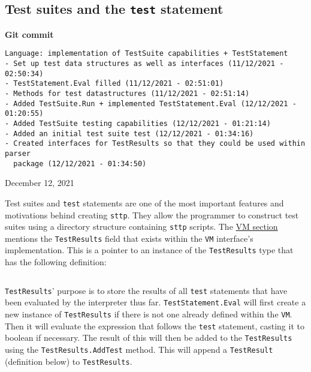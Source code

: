 \cprotect\subsection{Test suites and the \verb|test| statement}

\begin{center}
    \textbf{Git commit}
    \begin{verbatim}
Language: implementation of TestSuite capabilities + TestStatement
- Set up test data structures as well as interfaces (11/12/2021 - 02:50:34)
- TestStatement.Eval filled (11/12/2021 - 02:51:01)
- Methods for test datastructures (11/12/2021 - 02:51:14)
- Added TestSuite.Run + implemented TestStatement.Eval (12/12/2021 - 01:20:55)
- Added TestSuite testing capabilities (12/12/2021 - 01:21:14)
- Added an initial test suite test (12/12/2021 - 01:34:16)
- Created interfaces for TestResults so that they could be used within parser
  package (12/12/2021 - 01:34:50)
    \end{verbatim}
    \vspace{-1em}
    \tiny{December 12, 2021}
\end{center}

Test suites and \verb|test| statements are one of the most important features and motivations behind creating \verb|sttp|. They allow the programmer to construct test suites using a directory structure containing \verb|sttp| scripts. The \hyperref[sec:data-structures-vm]{VM section} mentions the \verb|TestResults| field that exists within the \verb|VM| interface's implementation. This is a pointer to an instance of the \verb|TestResults| type that has the following definition:

\inputminted[firstline=27, lastline=33, autogobble, breaklines, tabsize=4]{go}{../../src/test.go}

\verb|TestResults|' purpose is to store the results of all \verb|test| statements that have been evaluated by the interpreter thus far. \verb|TestStatement.Eval| will first create a new instance of \verb|TestResults| if there is not one already defined within the \verb|VM|. Then it will evaluate the expression that follows the \verb|test| statement, casting it to boolean if necessary. The result of this will then be added to the \verb|TestResults| using the \verb|TestResults.AddTest| method. This will append a \verb|TestResult| (definition below) to \verb|TestResults|.

\inputminted[firstline=19, lastline=25, autogobble, breaklines, tabsize=4]{go}{../../src/test.go}

